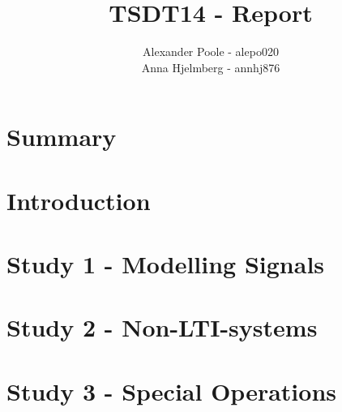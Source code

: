 \documentclass[a4paper,12pt]{article}
\title{TSDT14 - Report}
\author{Alexander Poole - alepo020 \\ Anna Hjelmberg - annhj876}
\begin{document}
\maketitle
	\thispagestyle{empty}
\newpage

\section{Summary}

\newpage
\tableofcontents
\newpage

\section{Introduction}

\section{Study 1 - Modelling Signals}



\section{Study 2 - Non-LTI-systems}



\section{Study 3 - Special Operations}


\end{document}
